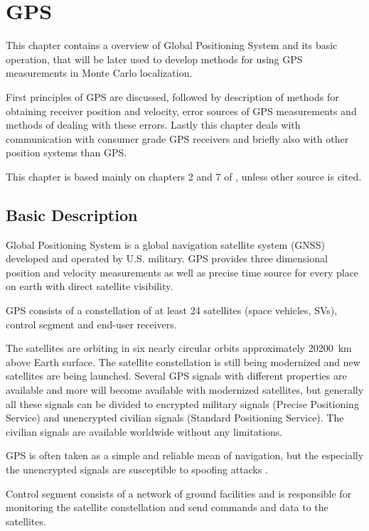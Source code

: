 \chapter{GPS}
\label{chap:gps}

This chapter contains a overview of Global Positioning System and
its basic operation, that will be later used to develop methods for using GPS
measurements in Monte Carlo localization.

First principles of GPS are discussed, followed by description of methods for
obtaining receiver position and velocity,
error sources of GPS measurements and methods of dealing with these errors.
Lastly this chapter deals with communication with consumer grade GPS receivers
and briefly also with other position systems than GPS.

This chapter is based mainly on chapters 2 and 7 of \cite{kaplan06}, unless other source is cited.

\section{Basic Description}

Global Positioning System is a global navigation satellite system (GNSS)
developed and operated by U.S. military.
GPS provides three dimensional position and velocity measurements as well as
precise time source for every place on earth with direct satellite visibility.

GPS consists of a constellation of at least 24 satellites (space vehicles, SVs),
control segment and end-user receivers.

The satellites are orbiting in six nearly circular orbits approximately \SI{20200}{\kilo\meter}
above Earth surface.
The satellite constellation is still being modernized \cite{gps-modernization-www}
and new satellites are being launched.
Several GPS signals with different properties are available and more will become available
with modernized satellites,
but generally all these signals can be divided to encrypted military signals 
(Precise Positioning Service) and unencrypted
civilian signals (Standard Positioning Service).
The civilian signals are available worldwide without any limitations.


GPS is often taken as a simple and reliable mean of navigation,
but the especially the unencrypted signals are susceptible to spoofing attacks \cite{tippenhauer11}.


Control segment consists of a network of ground facilities and is responsible for
monitoring the satellite constellation and send commands and data to the satellites.

